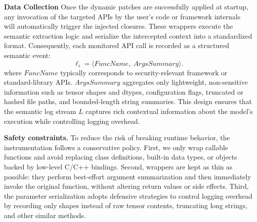 \noindent \textbf{Data Collection} 
Once the dynamic patches are successfully applied at startup, any invocation of the targeted APIs by the user's code or framework internals will automatically trigger the injected closures. These wrappers execute the semantic extraction logic and serialize the intercepted context into a standardized format. Consequently, each monitored API call is recorded as a structured semantic event:
\begin{equation}
\ell_i = \langle \textit{FuncName},\; \textit{ArgsSummary} \rangle.
\end{equation}
where $\textit{FuncName}$ typically corresponds to security-relevant framework or standard-library APIs. $\textit{ArgsSummary}$ aggregates only lightweight, non-sensitive information such as tensor shapes and dtypes, configuration flags, truncated or hashed file paths, and bounded-length string summaries. This design ensures that the semantic log stream $L$ captures rich contextual information about the model's execution while controlling logging overhead.

\noindent \textbf{Safety constraints.} To reduce the risk of breaking runtime behavior, the instrumentation follows a conservative policy. First, we only wrap callable functions and avoid replacing class definitions, built-in data types, or objects backed by low-level C/C++ bindings. Second, wrappers are kept as thin as possible: they perform best-effort argument summarization and then immediately invoke the original function, without altering return values or side effects. Third, the parameter serialization adopts defensive strategies to control logging overhead by recording only shapes instead of raw tensor contents, truncating long strings, and other similar methods. 

